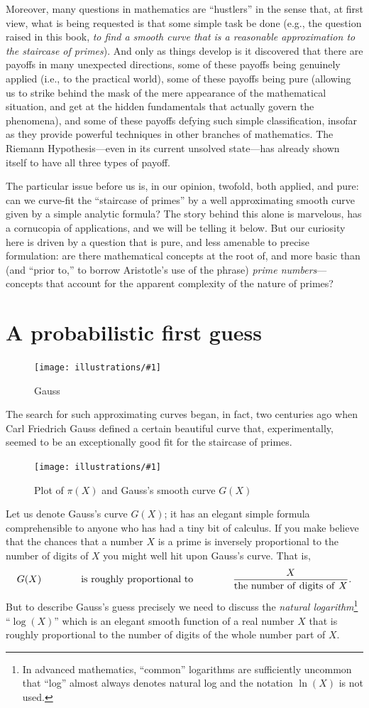 \documentclass[openany]{book}
\newcommand{\ill}[3]{%
   \begin{figure}[H]%
   \vspace{-2ex}
   \centering%
   \texttt{[image: illustrations/\#1]}%
   \caption{#3}%
   \vspace{-2ex}
    \end{figure}}
\theoremstyle{plain}
\theoremstyle{definition}
\newcommand{\RH}{Riemann Hypothesis\index{Riemann Hypothesis}}
\begin{document}
 Moreover, many questions in
mathematics are ``hustlers'' in the sense that, at first view, what is
being requested is that some simple task be done (e.g., the question
raised in this book, {\em to find a smooth curve that is a reasonable
  approximation to the staircase of primes}).  And only as things
develop is it discovered that there are payoffs in many unexpected
directions, some of these payoffs being genuinely applied (i.e., to
the practical world), some of these payoffs being pure (allowing us
to strike behind the mask of the mere appearance of the mathematical
situation, and get at the hidden fundamentals that actually govern the
phenomena), and some of these payoffs defying such simple
classification, insofar as they provide powerful techniques in other
branches of mathematics.  The \RH{}---even in its current
unsolved state---has already shown itself to have all three types of
payoff.

The particular issue before us is, in our opinion, twofold, both
applied, and pure: can we curve-fit the ``staircase of primes'' by a
well approximating smooth curve given by a simple analytic formula?
The story behind this alone is
marvelous, has a cornucopia of applications, and we will be telling it
below. But our curiosity here is driven by a question that is pure,
and less amenable to precise formulation: are there mathematical
concepts at the root of, and more basic than (and ``prior to,'' to
borrow Aristotle's use of the phrase) {\em prime numbers}---concepts
that account for the apparent complexity of the nature of primes?


\chapter{A probabilistic first guess\label{sec:firstguess} }

\ill{gauss}{.3}{Gauss}

The search for such approximating curves began, in fact, two centuries
ago when Carl Friedrich Gauss defined a certain beautiful curve that,
experimentally, seemed to be an exceptionally good fit for the
staircase of primes.

\ill{pi_Li}{.8}{Plot of $\pi(X)$ and Gauss's smooth curve $G(X)$}

Let us denote Gauss's curve $G(X)$; it has an
elegant simple formula comprehensible to anyone who has had a tiny bit
of calculus.  If you make believe that the chances that a number $X$ is
a prime is inversely proportional to the number of digits of $X$ you
might well hit upon Gauss's curve.
That is,
\vskip10pt
$$G(X)\hskip40pt  {\rm is\ roughly\ proportional\ to} \hskip40pt  {\frac{X}{{\rm the\ number\ of\ digits\ of\ } X}}.$$
\vskip10pt
But to describe Gauss's guess precisely we need to discuss the {\it natural logarithm}\footnote{In advanced mathematics, ``common'' logarithms are sufficiently uncommon that ``log'' almost always denotes natural
log and the notation $\ln(X)$ is not used.} ``$\log(X)$'' which is an elegant
smooth function of a real number $X$ that is roughly proportional
to the number of digits of the whole number part of $X$.
\end{document}
